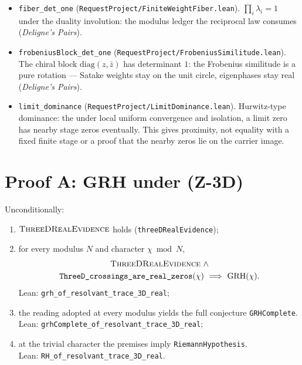 \begin{itemize}
(\texttt{RequestProject/FiniteWeightFiber.lean}). The local numerator is
self-reciprocal: the per-place functional equation whose global assembly has
fixed axis \(\Re s=\tfrac12\) --- the midline the crossings sit on (\emph{Deligne's Pairs}).
\item \texttt{fiber\_det\_one}
(\texttt{RequestProject/FiniteWeightFiber.lean}). \(\prod_i\lambda_i=1\)
under the duality involution: the modulus ledger the reciprocal law
consumes (\emph{Deligne's Pairs}).
\item \texttt{frobeniusBlock\_det\_one}
(\texttt{RequestProject/FrobeniusSimilitude.lean}). The chiral block
\(\mathrm{diag}(z,\bar z)\) has determinant \(1\): the Frobenius similitude
is a pure rotation --- Satake weights stay on the unit circle, eigenphases
stay real (\emph{Deligne's Pairs}).
\item \texttt{limit\_dominance}
(\texttt{RequestProject/LimitDominance.lean}). Hurwitz-type dominance: the
under local uniform convergence and isolation, a limit zero has nearby stage
zeros eventually.  This gives proximity, not equality with a fixed finite
stage or a proof that the nearby zeros lie on the carrier image.
\end{itemize}

\section{Proof A: GRH under (Z-3D)}\label{sec:grh-proofA}

\begin{theorem}\label{thm:grh-routeA}
Unconditionally:
\begin{enumerate}[label=\textup{(\roman*)},leftmargin=*,nosep]
\item \(\textsc{ThreeDRealEvidence}\) holds
(\texttt{threeDRealEvidence});
\item for every modulus \(N\) and character \(\chi\bmod N\),
\[
\begin{gathered}
\textsc{ThreeDRealEvidence}\ \wedge\\
\texttt{ThreeD\_crossings\_are\_real\_zeros}(\chi)
\ \Longrightarrow\ \mathrm{GRH}(\chi).
\end{gathered}
\]
Lean: \texttt{grh\_of\_resolvant\_trace\_3D\_real};
\item the reading adopted at every modulus yields the full conjecture
\texttt{GRHComplete}.\\
Lean: \texttt{grhComplete\_of\_resolvant\_trace\_3D\_real};
\item at the trivial character the premises imply
\texttt{RiemannHypothesis}.\\
Lean: \texttt{RH\_of\_resolvant\_trace\_3D\_real}.
\end{enumerate}
\end{theorem}

